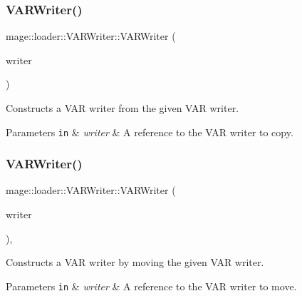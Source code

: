 \subsubsection{\texorpdfstring{V\+A\+R\+Writer()}{VARWriter()}\hspace{0.1cm}{\footnotesize\ttfamily [2/3]}}
{\footnotesize\ttfamily mage\+::loader\+::\+V\+A\+R\+Writer\+::\+V\+A\+R\+Writer (\begin{DoxyParamCaption}\item[{const \mbox{\hyperlink{classmage_1_1loader_1_1_v_a_r_writer}{V\+A\+R\+Writer}} \&}]{writer }\end{DoxyParamCaption})\hspace{0.3cm}{\ttfamily [delete]}}

Constructs a V\+AR writer from the given V\+AR writer.


\begin{DoxyParams}[1]{Parameters}
\mbox{\tt in}  & {\em writer} & A reference to the V\+AR writer to copy. \\
\hline
\end{DoxyParams}
\mbox{\label{classmage_1_1loader_1_1_v_a_r_writer_ab8a676252c909a6f8914d786048de255}} 
\subsubsection{\texorpdfstring{V\+A\+R\+Writer()}{VARWriter()}\hspace{0.1cm}{\footnotesize\ttfamily [3/3]}}
{\footnotesize\ttfamily mage\+::loader\+::\+V\+A\+R\+Writer\+::\+V\+A\+R\+Writer (\begin{DoxyParamCaption}\item[{\mbox{\hyperlink{classmage_1_1loader_1_1_v_a_r_writer}{V\+A\+R\+Writer}} \&\&}]{writer }\end{DoxyParamCaption})\hspace{0.3cm}{\ttfamily [default]}, {\ttfamily [noexcept]}}

Constructs a V\+AR writer by moving the given V\+AR writer.


\begin{DoxyParams}[1]{Parameters}
\mbox{\tt in}  & {\em writer} & A reference to the V\+AR writer to move. \\
\hline
\end{DoxyParams}
\mbox{\label{classmage_1_1loader_1_1_v_a_r_writer_af908fe01c6754dabec6ed3c45b852b3b}} 
